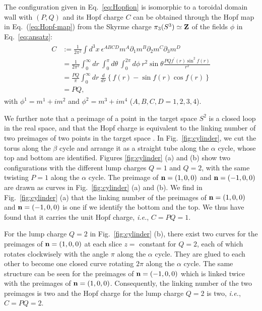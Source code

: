 \documentclass[aps,prd,preprint,
superscriptaddress]{revtex4}
\newcommand {\1}[1]{\frac{1}{#1}}
\newcommand {\2}[1]{\frac{i}{#1}}
\begin{document}
The configuration given in Eq.~\eqref{eq:Hopfion} 
is isomorphic to a toroidal domain wall with $(P, Q)$ and its Hopf charge $C$ can be obtained 
through the Hopf map in Eq.~(\ref{eq:Hopf-map})
from the Skyrme charge $\pi_3(S^3) \simeq {\bf Z}$ 
of the fields $\phi$ in Eq.~\eqref{eq:ansatz}:
\begin{align}
\begin{split}
C &:= \frac{1}{2 \pi^2} \int d^3x\: \epsilon^{ABCD} 
m^A \partial_1 m^B \partial_2 m^C \partial_3 m^D \\
&= \frac{1}{2 \pi^2} \int_0^{\infty} dr\: \int_0^\pi d\theta\: \int_0^{2 \pi} d\phi\: r^2 \sin\theta \frac{P Q f^\prime(r) \sin^2 f(r)}{r^2} \\
&= \frac{P Q}{\pi} \int_0^\infty dr\: \frac{d}{dr} \left\{ f(r) - \sin f(r) \cos f(r) \right\} \\
&= P Q,
\end{split}
\end{align}
with $\phi^1 = m^1 + i m^2$ and $\phi^2 = m^3 + i m^4$ 
($A,B,C,D=1,2,3,4$).

We further note that a preimage of a point in the target space 
$S^2$ is a closed loop in the real space, 
and that the Hopf charge is equivalent to the linking number 
of two preimages of two points in the target space \cite{deVega:1977rk}. 
In Fig.~\ref{fig:cylinder}, 
we cut the torus along the $\beta$ cycle and arrange it as a straight tube along the $\alpha$ cycle, 
whose top and bottom are identified. 
Figures \ref{fig:cylinder} (a) and (b) 
show two configurations with the different lump charges $Q=1$ and $Q=2$, with the same twisting $P=1$ along the $\alpha$ cycle.
The preimage of ${\bf n} = (1,0,0)$ and ${\bf n} = (-1,0,0)$
are drawn as curves in Fig.~\ref{fig:cylinder} (a) and (b). 
We find in Fig.~\ref{fig:cylinder} (a) 
that the linking number of the preimages of ${\bf n}=(1,0,0)$ and 
${\bf n}=(-1,0,0)$ is one if we identify the bottom and the top. 
We thus have found that it carries the unit Hopf charge, {\it i.e.},
$C = P Q = 1$.

For the lump charge $Q=2$ in Fig.~\ref{fig:cylinder} (b), 
there exist two curves for the preimages of ${\bf n}=(1,0,0)$ at each slice $z=$ constant for $Q=2$,
each of which rotates clockwisely with the angle $\pi$ along the $\alpha$ cycle.
They are glued to each other to become one closed curve rotating $2\pi$ along the $\alpha$ cycle.
The same structure can be seen for the preimages of ${\bf n}=(-1,0,0)$ which is linked twice with the preimages of
${\bf n}=(1,0,0)$.
Consequently, the linking number of 
the two preimages is two and the Hopf charge for the lump charge $Q=2$ is two, {\it i.e.}, $C = P Q = 2$. 
\end{document}
